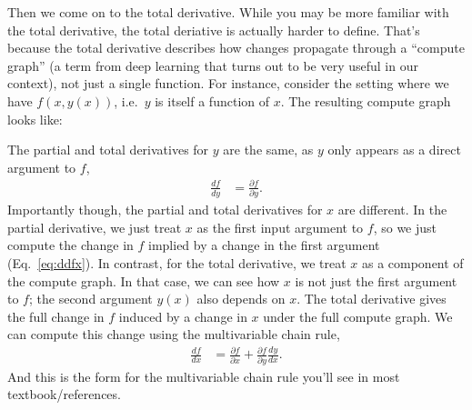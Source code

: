 \documentclass{article}
\newcommand{\dd}[2][]{\frac{\partial #1}{\partial #2}}
\newcommand{\dt}[2][]{\frac{d #1}{d #2}}
\begin{document}
Then we come on to the total derivative.
While you may be more familiar with the total derivative, the total deriative is actually harder to define.
That's because the total derivative describes how changes propagate through a ``compute graph'' (a term from deep learning that turns out to be very useful in our context), not just a single function.
For instance, consider the setting where we have $f(x, y(x))$, i.e.\ $y$ is itself a function of $x$.
The resulting compute graph looks like:
\begin{center}
\end{center}
The partial and total derivatives for $y$ are the same, as $y$ only appears as a direct argument to $f$,
\begin{align}
  \dt[f]{y} &= \dd[f]{y}.
\end{align}
Importantly though, the partial and total derivatives for $x$ are different.
In the partial derivative, we just treat $x$ as the first input argument to $f$, so we just compute the change in $f$ implied by a change in the first argument (Eq.~\ref{eq:ddfx}).
In contrast, for the total derivative, we treat $x$ as a component of the compute graph.
In that case, we can see how $x$ is not just the first argument to $f$; the second argument $y(x)$ also depends on $x$.
The total derivative gives the full change in $f$ induced by a change in $x$ under the full compute graph.
We can compute this change using the multivariable chain rule,
\begin{align}
  \dt[f]{x} &= \dd[f]{x} + \dd[f]{y} \dt[y]{x}.
\end{align}
And this is the form for the multivariable chain rule you'll see in most textbook/references.
\end{document}
